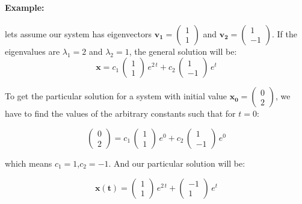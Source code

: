 \documentclass{tufte-book} %
\begin{document}
\paragraph{Example:} lets assume our system has eigenvectors $\mathbf{v_1}=\begin{pmatrix} 1 \\ 1 \end{pmatrix}$ and
	$\mathbf{v_2}=\begin{pmatrix} 1 \\ -1 \end{pmatrix}$. If the eigenvalues are $\lambda_1=2$ and $\lambda_2=1$, the general solution will be:
\begin{equation}
	\mathbf{x}= c_1 \, \begin{pmatrix} 1 \\ 1 \end{pmatrix} \, e^{2 \, t} + c_2 \, \begin{pmatrix} 1 \\ -1 \end{pmatrix} \, e^{ t} 
\end{equation}

To get the particular solution for a system with initial value $\mathbf{x_0}=\begin{pmatrix} 0 \\ 2 \end{pmatrix}$, we have to find the values of the arbitrary constants such that for $t=0$:

\begin{equation}
	\begin{pmatrix} 0 \\ 2 \end{pmatrix}= c_1 \, \begin{pmatrix} 1 \\ 1 \end{pmatrix} \, e^{0} + c_2 \, \begin{pmatrix} 1 \\ -1 \end{pmatrix} \, e^{0} 
\end{equation}

which means $c_1=1$,$c_2=-1$. And our particular solution will be:

\begin{equation}
	\mathbf{x(t)}=   \begin{pmatrix} 1 \\ 1 \end{pmatrix} \, e^{2 \, t} +  \begin{pmatrix} -1 \\ 1 \end{pmatrix} \, e^{t} 
\end{equation}
\end{document}
